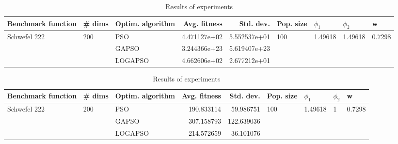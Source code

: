 \documentclass{article}
\begin{document}
\begin{table}
\centering
\caption{Results of experiments}
\begin{tabular}{lllrrllll}
\toprule
           Benchmark function &              \# dims & Optim. algorithm &  Avg. fitness &    Std. dev. &            Pop. size &               $\phi_{1}$ &               $\phi_{2}$ &                       w \\
\midrule
\multirow{3}{*}{Schwefel 222} & \multirow{3}{*}{200} &              PSO &  4.471127e+02 & 5.552537e+01 & \multirow{3}{*}{100} & \multirow{3}{*}{1.49618} & \multirow{3}{*}{1.49618} & \multirow{3}{*}{0.7298} \\
                              &                      &            GAPSO &  3.244366e+23 & 5.619407e+23 &                      &                          &                          &                         \\
                              &                      &          LOGAPSO &  4.662606e+02 & 2.677212e+01 &                      &                          &                          &                         \\
\bottomrule
\end{tabular}
\end{table}
\begin{table}
\centering
\caption{Results of experiments}
\begin{tabular}{lllrrllll}
\toprule
           Benchmark function &              \# dims & Optim. algorithm &  Avg. fitness &  Std. dev. &            Pop. size &               $\phi_{1}$ &         $\phi_{2}$ &                       w \\
\midrule
\multirow{3}{*}{Schwefel 222} & \multirow{3}{*}{200} &              PSO &    190.833114 &  59.986751 & \multirow{3}{*}{100} & \multirow{3}{*}{1.49618} & \multirow{3}{*}{1} & \multirow{3}{*}{0.7298} \\
                              &                      &            GAPSO &    307.158793 & 122.639036 &                      &                          &                    &                         \\
                              &                      &          LOGAPSO &    214.572659 &  36.101076 &                      &                          &                    &                         \\
\bottomrule
\end{tabular}
\end{table}
\end{document}
